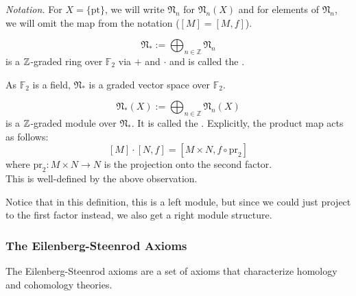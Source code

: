 \documentclass[a4paper,11pt]{article}
\begin{document}

\noindent\textit{Notation.} For \(X=\{\mathrm{pt}\}\), we will write \(\mathfrak{N}_n\) for \(\mathfrak{N}_n(X)\) and for elements of \(\mathfrak{N}_n\), we will omit the map from the notation (\([M]=[M,f]\)).

\begin{definition}\label{bordism ring}
    \[\mathfrak{N}_\ast:=\bigoplus_{n\in\mathbb{Z}}\mathfrak{N}_n\]
    is a \(\mathbb{Z}\)-graded ring over \(\mathbb{F}_2\) via \(+\) and \(\cdot\) and is called the .
\end{definition}

\begin{remark}
    As \(\mathbb{F}_2\) is a field, \(\mathfrak{N}_\ast\) is a graded vector space over \(\mathbb{F}_2\).
\end{remark}


\begin{definition}\label{bordism module}
    \[\mathfrak{N}_\ast(X):=\bigoplus_{n\in\mathbb{Z}}\mathfrak{N}_n(X)\]
    is a \(\mathbb{Z}\)-graded module over \(\mathfrak{N}_\ast\). It is called the . Explicitly, the product map acts as follows:
    \[[M]\cdot[N,f]=[M\times N, f\circ \mathrm{pr}_2]\]
    where \(\mathrm{pr}_2:M\times N\to N\) is the projection onto the second factor.\\
    This is well-defined by the above observation.
\end{definition}

\begin{remark}
    Notice that in this definition, this is a left module, but since we could just project to the first factor instead, we also get a right module structure.
\end{remark}

\subsubsection{The Eilenberg-Steenrod Axioms}\label{es axioms}
The Eilenberg-Steenrod axioms are a set of axioms that characterize homology and cohomology theories.
\end{document}
